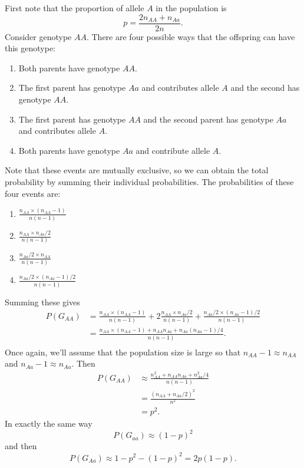\documentclass[addpoints,answers]{exam}
\begin{document}
\begin{questions}
\begin{solution}
First note that the proportion of allele $A$ in the population is
$$
p=\frac{2n_{AA} + n_{Aa}}{2n}.
$$
Consider genotype $AA$. There are four possible ways that the offspring can have this genotype:
\begin{enumerate}
\item Both parents have genotype $AA$.
\item The first parent has genotype $Aa$ and contributes allele $A$ and the second has genotype $AA$.
\item The first parent has genotype $AA$ and the second parent has genotype $Aa$ and contributes allele $A$.
\item Both parents have genotype $Aa$ and contribute allele $A$. 
\end{enumerate}
Note that these events are mutually exclusive, so we can obtain the total probability  by summing their individual probabilities. The probabilities of these four events are:
\begin{enumerate}
\item $\frac{n_{AA}\times (n_{AA}-1)}{n(n-1)}$
\item $\frac{n_{AA}\times n_{Aa}/2}{n(n-1)}$
\item $\frac{n_{Aa}/2\times n_{AA}}{n(n-1)}$
\item $\frac{n_{Aa}/2\times (n_{Aa}-1)/2}{n(n-1)}$
\end{enumerate}
Summing these gives
$$
\begin{aligned}
P(G_{AA})
&=\frac{n_{AA}\times (n_{AA}-1)}{n(n-1)} + 2\frac{n_{AA}\times n_{Aa}/2}{n(n-1)} +
\frac{n_{Aa}/2\times (n_{Aa}-1)/2}{n(n-1)}\\
&=\frac{n_{AA}\times (n_{AA}-1) + n_{AA}n_{Aa} + n_{Aa}(n_{Aa}-1)/4}{n(n-1)}.\\
\end{aligned}
$$
Once again, we'll assume that the population size is large so that $n_{AA}-1\approx n_{AA}$ and $n_{Aa}-1\approx{n_{Aa}}$. Then
$$
\begin{aligned}
P(G_{AA})
&\approx \frac{n_{AA}^2 + n_{AA}n_{Aa} + n_{Aa}^2/4}{n(n-1)}\\
&=\frac{(n_{AA} + n_{Aa}/2)^2}{n^2}\\
&=p^2.
\end{aligned}
$$
In exactly the same way
$$
P(G_{aa})\approx(1-p)^2
$$
and then
$$
P(G_{Aa})\approx 1- p^2-(1-p)^2=2p(1-p).
$$
\end{solution}

\xdef\mycounter{\arabic{question}}%
\end{questions}
\end{document}
